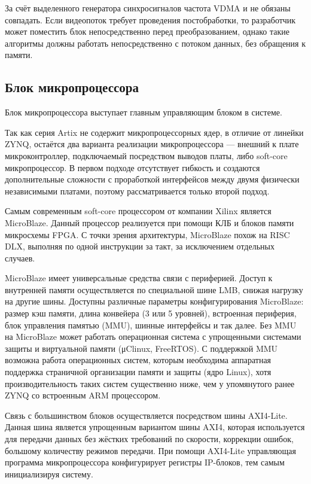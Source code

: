 За счёт выделенного генератора синхросигналов частота VDMA и  не обязаны совпадать.
Если видеопоток требует проведения постобработки, то разработчик может поместить блок непосредственно перед
преобразованием, однако такие алгоритмы должны работать непосредственно с потоком данных, без обращения к памяти.

\subsection{Блок микропроцессора}
\label{sec:structural:microprocessor}
Блок микропроцессора выступает главным управляющим блоком в системе.

Так как серия Artix не содержит микропроцессорных ядер, в отличие от линейки ZYNQ,
остаётся два варианта реализации микропроцессора --- внешний к плате микроконтроллер, подключаемый
посредством выводов платы, либо soft-core микропроцессор. В первом подходе отсутствует гибкость и создаются
дополнительные сложности с проработкой интерфейсов между двумя физически независимыми платами, поэтому
рассматривается только второй подход.

Самым современным soft-core процессором от компании Xilinx является MicroBlaze. Данный процессор реализуется
при помощи КЛБ и блоков памяти микросхемы FPGA. С точки зрения архитектуры, MicroBlaze похож на RISC DLX,
выполняя по одной инструкции за такт, за исключением отдельных случаев.

MicroBlaze имеет универсальные средства связи с периферией. Доступ к внутренней памяти осуществляется по специальной
шине LMB, снижая нагрузку на другие шины. Доступны различные параметры конфигурирования MicroBlaze:
размер кэш памяти, длина конвейера (3 или 5 уровней), встроенная периферия, блок управления памятью (MMU),
шинные интерфейсы и так далее. Без MMU на MicroBlaze может работать операционная система с упрощенными системами
защиты и виртуальной памяти (μClinux, FreeRTOS). С поддержкой MMU возможна работа операционных систем, которым необходима
аппаратная поддержка страничной организации памяти и защиты (ядро Linux), хотя производительность таких систем существенно ниже,
чем у упомянутого ранее ZYNQ со встроенным ARM процессором.

Связь с большинством блоков осуществляется посредством шины AXI4-Lite. Данная шина является упрощенным
вариантом шины AXI4, которая используется для передачи данных без жёстких требований по скорости, коррекции ошибок,
большому количеству режимов передачи. При помощи AXI4-Lite управляющая программа микропроцессора конфигурирует регистры
IP-блоков, тем самым инициализируя систему.


